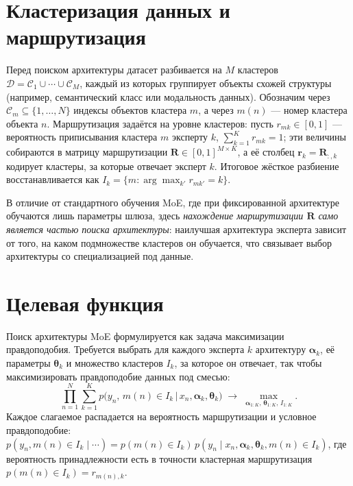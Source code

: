 \section{Кластеризация данных и маршрутизация}
\label{sec:clustering}

Перед поиском архитектуры датасет разбивается на $M$ кластеров
$\mathcal{D} = \mathcal{C}_1 \cup \cdots \cup \mathcal{C}_M$, каждый из
которых группирует объекты схожей структуры (например, семантический
класс или модальность данных). Обозначим через
$\mathcal{C}_m \subseteq \{1, \ldots, N\}$ индексы объектов кластера
$m$, а через $m(n)$ --- номер кластера объекта $n$. Маршрутизация
задаётся на уровне кластеров: пусть $r_{mk} \in [0, 1]$ --- вероятность
приписывания кластера $m$ эксперту $k$, $\sum_{k=1}^{K} r_{mk} = 1$;
эти величины собираются в матрицу маршрутизации
$\mathbf{R} \in [0, 1]^{M \times K}$, а её столбец
$\mathbf{r}_k = \mathbf{R}_{:,k}$ кодирует кластеры, за которые отвечает
эксперт $k$. Итоговое жёсткое разбиение восстанавливается как
$I_k = \{m : \arg\max_{k'} r_{mk'} = k\}$.

В отличие от стандартного обучения MoE, где при фиксированной
архитектуре обучаются лишь параметры шлюза, здесь \emph{нахождение
маршрутизации $\mathbf{R}$ само является частью поиска архитектуры}:
наилучшая архитектура эксперта зависит от того, на каком подмножестве
кластеров он обучается, что связывает выбор архитектуры со
специализацией под данные.

\section{Целевая функция}
\label{sec:objective}

Поиск архитектуры MoE формулируется как задача максимизации
правдоподобия. Требуется выбрать для каждого эксперта $k$ архитектуру
$\boldsymbol{\alpha}_k$, её параметры $\boldsymbol{\theta}_k$ и множество
кластеров $I_k$, за которое он отвечает, так чтобы максимизировать
правдоподобие данных под смесью:
\begin{equation}
\label{eq:moe_likelihood}
\prod_{n=1}^{N} \sum_{k=1}^{K} p\bigl(y_n,\, m(n) \in I_k \,\big|\, x_n, \boldsymbol{\alpha}_k, \boldsymbol{\theta}_k\bigr)
\;\to\; \max_{\boldsymbol{\alpha}_{1:K},\, \boldsymbol{\theta}_{1:K},\, I_{1:K}}.
\end{equation}
Каждое слагаемое распадается на вероятность маршрутизации и условное
правдоподобие:
$p(y_n, m(n) \in I_k \mid \cdots) = p(m(n) \in I_k)\, p(y_n \mid x_n, \boldsymbol{\alpha}_k, \boldsymbol{\theta}_k, m(n) \in I_k)$,
где вероятность принадлежности есть в точности кластерная маршрутизация
$p(m(n) \in I_k) = r_{m(n), k}$.

